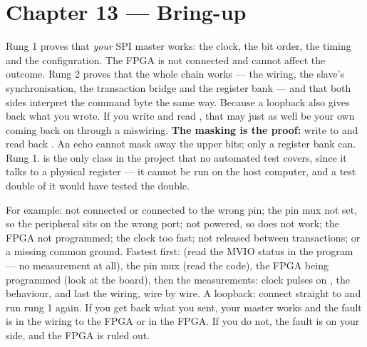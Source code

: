 \section*{Chapter 13 --- Bring-up}

 Rung 1 proves that \emph{your} SPI master works: the clock, the bit order, the timing and
the configuration. The FPGA is not connected and cannot affect the outcome. Rung 2 proves that the
whole chain works --- the wiring, the slave's synchronisation, the transaction bridge and the
register bank --- and that both sides interpret the command byte the same way.
 Because a loopback also gives back what you wrote. If you write  and read
, that may just as well be your own  coming back on 
through a miswiring. \textbf{The masking is the proof:} write  to 
and read back . An echo cannot mask away the upper bits; only a register bank
can.
 Rung 1.  is the only class in the project that no automated test
covers, since it talks to a physical register --- it cannot be run on the host computer, and a
test double of it would have tested the double.

 For example:  not connected or connected to the wrong pin; the pin mux not set,
so the peripheral sits on the wrong port;  not powered, so  does not
work; the FPGA not programmed; the clock too fast;  not released between transactions; or
a missing common ground.
 Fastest first:  (read the MVIO status in the program --- no measurement at
all), the pin mux (read the code), the FPGA being programmed (look at the board), then the
measurements: clock pulses on , the  behaviour, and last the wiring, wire by
wire.
 A loopback: connect  straight to  and run rung 1 again. If you get
back what you sent, your master works and the fault is in the wiring to the FPGA or in the FPGA.
If you do not, the fault is on your side, and the FPGA is ruled out.


